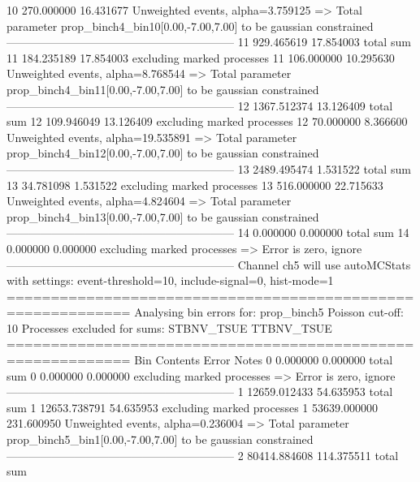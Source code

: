 10         270.000000      16.431677       Unweighted events, alpha=3.759125
  => Total parameter prop_binch4_bin10[0.00,-7.00,7.00] to be gaussian constrained
------------------------------------------------------------
11         929.465619      17.854003       total sum                     
11         184.235189      17.854003       excluding marked processes    
11         106.000000      10.295630       Unweighted events, alpha=8.768544
  => Total parameter prop_binch4_bin11[0.00,-7.00,7.00] to be gaussian constrained
------------------------------------------------------------
12         1367.512374     13.126409       total sum                     
12         109.946049      13.126409       excluding marked processes    
12         70.000000       8.366600        Unweighted events, alpha=19.535891
  => Total parameter prop_binch4_bin12[0.00,-7.00,7.00] to be gaussian constrained
------------------------------------------------------------
13         2489.495474     1.531522        total sum                     
13         34.781098       1.531522        excluding marked processes    
13         516.000000      22.715633       Unweighted events, alpha=4.824604
  => Total parameter prop_binch4_bin13[0.00,-7.00,7.00] to be gaussian constrained
------------------------------------------------------------
14         0.000000        0.000000        total sum                     
14         0.000000        0.000000        excluding marked processes    
  => Error is zero, ignore      
------------------------------------------------------------
Channel ch5 will use autoMCStats with settings: event-threshold=10, include-signal=0, hist-mode=1
============================================================
Analysing bin errors for: prop_binch5
Poisson cut-off: 10
Processes excluded for sums: STBNV_TSUE TTBNV_TSUE
============================================================
Bin        Contents        Error           Notes                         
0          0.000000        0.000000        total sum                     
0          0.000000        0.000000        excluding marked processes    
  => Error is zero, ignore      
------------------------------------------------------------
1          12659.012433    54.635953       total sum                     
1          12653.738791    54.635953       excluding marked processes    
1          53639.000000    231.600950      Unweighted events, alpha=0.236004
  => Total parameter prop_binch5_bin1[0.00,-7.00,7.00] to be gaussian constrained
------------------------------------------------------------
2          80414.884608    114.375511      total sum                     
